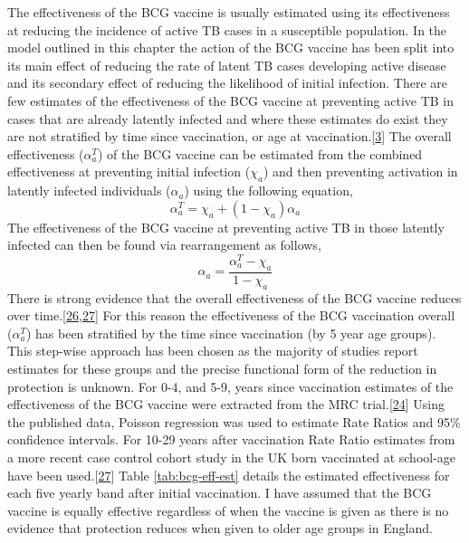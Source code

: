 \documentclass[11pt,twoside]{bristolthesis}
\begin{document}
  The effectiveness of the BCG vaccine is usually estimated using its effectiveness at reducing the incidence of active TB cases in a susceptible population. In the model outlined in this chapter the action of the BCG vaccine has been split into its main effect of reducing the rate of latent TB cases developing active disease and its secondary effect of reducing the likelihood of initial infection. There are few estimates of the effectiveness of the BCG vaccine at preventing active TB in cases that are already latently infected and where these estimates do exist they are not stratified by time since vaccination, or age at vaccination.{[}\protect\hyperlink{ref-Roy2014}{3}{]} The overall effectiveness (\(\alpha^T_a\)) of the BCG vaccine can be estimated from the combined effectiveness at preventing initial infection (\(\chi_a\)) and then preventing activation in latently infected individuals (\(\alpha_a\)) using the following equation,
  \begin{equation}
    \alpha^T_a = \chi_a + (1 - \chi_a) \alpha_a
    \label{eq:full-bcg-effectiveness}
  \end{equation}
  The effectiveness of the BCG vaccine at preventing active TB in those latently infected can then be found via rearrangement as follows,
  \begin{equation}
    \alpha_a = \frac{\alpha^T_a - \chi_a}{1 - \chi_a}
    \label{eq:latent-active-bcg-effectiveness}
  \end{equation}
  There is strong evidence that the overall effectiveness of the BCG vaccine reduces over time.{[}\protect\hyperlink{ref-Abubakar2013}{26},\protect\hyperlink{ref-Mangtani2017}{27}{]} For this reason the effectiveness of the BCG vaccination overall (\(\alpha^T_a\)) has been stratified by the time since vaccination (by 5 year age groups). This step-wise approach has been chosen as the majority of studies report estimates for these groups and the precise functional form of the reduction in protection is unknown. For 0-4, and 5-9, years since vaccination estimates of the effectiveness of the BCG vaccine were extracted from the MRC trial.{[}\protect\hyperlink{ref-Hart1972}{24}{]} Using the published data, Poisson regression was used to estimate Rate Ratios and 95\% confidence intervals. For 10-29 years after vaccination Rate Ratio estimates from a more recent case control cohort study in the UK born vaccinated at school-age have been used.{[}\protect\hyperlink{ref-Mangtani2017}{27}{]} Table \ref{tab:bcg-eff-est} details the estimated effectiveness for each five yearly band after initial vaccination. I have assumed that the BCG vaccine is equally effective regardless of when the vaccine is given as there is no evidence that protection reduces when given to older age groups in England.
\end{document}
